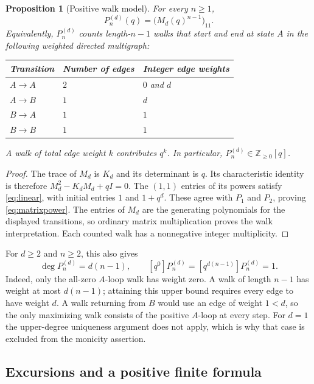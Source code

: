 \documentclass[11pt,letterpaper]{article}
\numberwithin{equation}{section}
\newtheorem{proposition}[theorem]{Proposition}
\theoremstyle{definition}
\newcommand{\Z}{\mathbb Z}
\begin{document}
\begin{proposition}[Positive walk model]\label{prop:walk}
For every $n\geq1$,
\begin{equation}\label{eq:matrixpower}
 P_n^{(d)}(q)=\bigl(M_d(q)^{n-1}\bigr)_{11}.
\end{equation}
Equivalently, $P_n^{(d)}$ counts length-$n-1$ walks that start and end at state
$A$ in the following weighted directed multigraph:
\begin{center}
\begin{tabular}{lll}
\toprule
Transition & Number of edges & Integer edge weights\\
\midrule
$A\to A$ & $2$ & $0$ and $d$\\
$A\to B$ & $1$ & $d$\\
$B\to A$ & $1$ & $1$\\
$B\to B$ & $1$ & $1$\\
\bottomrule
\end{tabular}
\end{center}
A walk of total edge weight $k$ contributes $q^k$. In particular,
$P_n^{(d)}\in\Z_{\geq0}[q]$.
\end{proposition}
\begin{proof}
The trace of $M_d$ is $K_d$ and its determinant is $q$. Its characteristic
identity is therefore $M_d^2-K_dM_d+qI=0$. The $(1,1)$ entries of its powers
satisfy \eqref{eq:linear}, with initial entries $1$ and $1+q^d$. These agree
with $P_1$ and $P_2$, proving \eqref{eq:matrixpower}. The entries of $M_d$
are the generating polynomials for the displayed transitions, so ordinary
matrix multiplication proves the walk interpretation. Each counted walk
has a nonnegative integer multiplicity.
\end{proof}

For $d\geq2$ and $n\geq2$, this also gives
\begin{equation}\label{eq:degree}
 \deg P_n^{(d)}=d(n-1),\qquad
 [q^0]P_n^{(d)}=[q^{d(n-1)}]P_n^{(d)}=1.
\end{equation}
Indeed, only the all-zero $A$-loop walk has weight zero. A walk of length
$n-1$ has weight at most $d(n-1)$; attaining this upper bound requires every
edge to have weight $d$. A walk returning from $B$ would use an edge of
weight $1<d$, so the only maximizing walk consists of the positive $A$-loop
at every step. For $d=1$ the upper-degree uniqueness argument does not apply,
which is why that case is excluded from the monicity assertion.

\subsection{Excursions and a positive finite formula}
\end{document}
